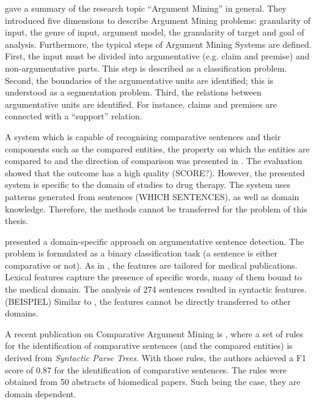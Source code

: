 \label{sec:argth}
\label{sec:argmine}
\cite{Lippi2016Argumentation-M} gave a summary of the research topic \enquote{Argument Mining} in general. They introduced five dimensions to describe Argument Mining problems: granularity of input, the genre of input, argument model, the granularity of target and goal of analysis.  Furthermore, the typical steps of Argument Mining Systems are defined. First, the input must be divided into argumentative (e.g. claim and premise) and non-argumentative parts. This step is described as a classification problem. Second, the boundaries of the argumentative units are identified; this is understood as a segmentation problem. Third, the relations between argumentative units are identified. For instance, claims and premises are connected with a \enquote{support} relation.




A system which is capable of recognising comparative sentences and their components such as the compared entities, the property on which the entities are compared to and the direction of comparison was presented in \cite{fiszman2007interpreting}. The evaluation showed that the outcome has a high quality (SCORE?). However, the presented system is specific to the domain of studies to drug therapy. The system uses patterns generated from sentences (WHICH SENTENCES), as well as domain knowledge. Therefore, the methods cannot be transferred for the problem of this thesis.

\cite{park2012identifying} presented a domain-specific approach on argumentative sentence detection. The problem is formulated as a binary classification task (a sentence is either comparative or not). As in \cite{fiszman2007interpreting}, the features are tailored for medical publications. Lexical features capture the presence of specific words, many of them bound to the medical domain. The analysis of 274 sentences resulted in syntactic features. (BEISPIEL) Similar to \cite{fiszman2007interpreting}, the features cannot be directly transferred to other domains.

A recent publication on Comparative Argument Mining is \cite{gupta2017identifying}, where a set of rules for the identification of comparative sentences (and the compared entities) is derived from \emph{Syntactic Parse Trees}. With those rules, the authors achieved a F1 score of 0.87 for the identification of comparative sentences. The rules were obtained from 50 abstracts of biomedical papers. Such being the case, they are domain dependent.\newline

